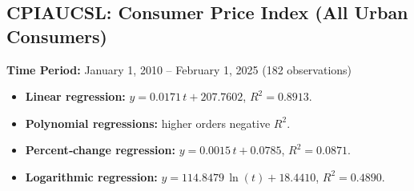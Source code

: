 \documentclass[11pt,a4paper]{article}
\begin{document}
\clearpage
\subsection{CPIAUCSL: Consumer Price Index (All Urban Consumers)}
\textbf{Time Period:} January 1, 2010 – February 1, 2025 (182 observations)

\begin{itemize}
  \item \textbf{Linear regression:} \(y = 0.0171\,t + 207.7602\), \(R^2 = 0.8913\).
  \item \textbf{Polynomial regressions:} higher orders negative \(R^2\).
  \item \textbf{Percent‐change regression:} \(y = 0.0015\,t + 0.0785\), \(R^2 = 0.0871\).
  \item \textbf{Logarithmic regression:} \(y = 114.8479\,\ln(t) + 18.4410\), \(R^2 = 0.4890\).
\end{itemize}
\end{document}
